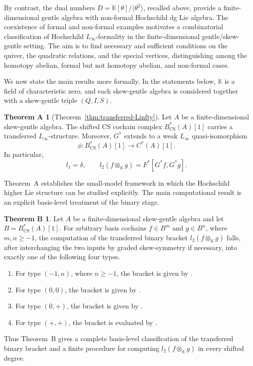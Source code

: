 \documentclass[11pt,a4paper,reqno]{amsart}
\newcommand{\mK}{\mathbb K}
\theoremstyle{plain}
\theoremstyle{definition}
\numberwithin{equation}{section}
\newtheorem*{maintheorema}{Theorem A}
\newtheorem*{maintheoremb}{Theorem B}
\begin{document}
	By contrast, the dual numbers
	$D=\mK[\theta]/\langle\theta^2\rangle$, recalled above, provide a
	finite-dimensional gentle algebra with non-formal Hochschild dg Lie
	algebra. The coexistence of formal and non-formal examples motivates
	a combinatorial classification of Hochschild $L_\infty$-formality
	in the finite-dimensional gentle/skew-gentle setting. The aim is to
	find necessary and sufficient conditions on the quiver, the quadratic
	relations, and the special vertices, distinguishing among the
	homotopy abelian, formal but not homotopy abelian, and non-formal cases.
	
	We now state the main results more formally.  In the statements below, $\mK$
	is a field of characteristic zero, and each skew-gentle algebra is considered
	together with a skew-gentle triple $(Q,I,S)$.
	
	\begin{maintheorema}[Theorem~\ref{thm:transferred-Linfty}]
		Let $A$ be a finite-dimensional skew-gentle algebra.  The shifted CS cochain
		complex $B_{\mathrm{CS}}^*(A)[1]$ carries a transferred $L_\infty$-structure.
		Moreover, $G^*$ extends to a weak $L_\infty$
		quasi-isomorphism
		\[
		\phi:B_{\mathrm{CS}}^*(A)[1]\longrightarrow C^*(A)[1].
		\]
		In particular,
		\[
		l_1=\delta,\qquad
		l_2(f\otimes_{\mK}g)=F^*[G^*f,G^*g].
		\]
	\end{maintheorema}
	
	Theorem~A establishes the small-model framework in which the Hochschild
	higher Lie structure can be studied explicitly.  The main computational
	result is an explicit basis-level treatment of the binary stage.
	
	\begin{maintheoremb}
		Let $A$ be a finite-dimensional skew-gentle algebra and let
		$B=B_{\mathrm{CS}}^*(A)[1]$.  For arbitrary basis cochains $f\in B^m$ and
		$g\in B^n$, where $m,n\geq-1$, the computation of the transferred binary
		bracket $l_2(f\otimes_{\mK}g)$ falls, after interchanging the two inputs by
		graded skew-symmetry if necessary, into exactly one of the following four
		types.
		
		\begin{enumerate}[label=\textnormal{(\arabic*)}]
			\item
			For type $(-1,n)$, where $n\geq-1$, the bracket is given by
			.
			
			\item
			For type $(0,0)$, the bracket is given by
			.
			
			\item
			For type $(0,+)$, the bracket is given by
			.
			
			\item
			For type $(+,+)$, the bracket is evaluated by
			.
		\end{enumerate}
	\end{maintheoremb}
	Thus Theorem~B gives a complete basis-level classification of the
	transferred binary bracket and a finite procedure for computing
	$l_2(f\otimes_{\mK}g)$ in every shifted degree.
	
\end{document}
